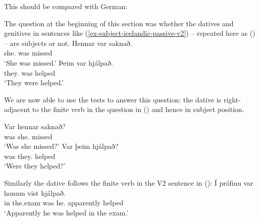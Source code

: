 This should be compared with German:
\eal
{}
\zl


The question at the beginning of this section was whether the datives and genitives in sentences
like (\ref{ex-subject-icelandic-passive-v2}) -- repeated here as () -- are subjects or not.
\eal
\ex 
\gll Hennar     var saknað.\\
     she.\GEN{} was missed\\\icelandic
\glt `She was missed.'
\ex 
\gll Þeim        var hjálpað.\\
     they.\DAT{} was helped\\
\glt `They were helped.'
\zl

We are now able to use the tests to answer this question: the dative is right-adjacent to the finite
verb in the question in () and hence in subject position.

\eal
\ex 
\gll Var hennar saknað?\\
     was she.\GEN{} missed\\\icelandic
\glt `Was she missed?'
\ex
\gll Var þeim       hjálpað?\\
     was they.\DAT{} helped   \\
\glt `Were they helped?'
\zl



Similarly the dative follows the finite verb in the V2 sentence in ():
\ea
\gll Í prófinu  var honum vist hjálpað.\\
     in the.exam was he.\DAT{} apparently helped\\\icelandic
\glt `Apparently he was helped in the exam.'
\z

